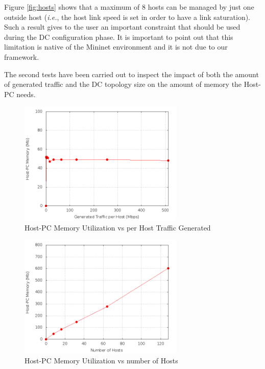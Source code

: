 \documentclass[12pt,english,oneside]{book}
\begin{document}
Figure \ref{fig:hosts} shows that a maximum of $8$ hosts can be managed by just one outside host (\textit{i.e.}, the host link speed is set in order to have a link saturation).
Such a result gives to the user an important constraint that should be used during the DC configuration phase.
It is important to point out that this limitation is native of the Mininet environment and it is not due to our framework.

The second tests have been carried out to inspect the impact of both the amount of generated traffic and the DC topology size on the amount of memory the Host-PC needs.

\newpage

\begin{figure}[h!tbp]
        \centering
        \includegraphics[width=0.7\textwidth]{figures/mem1_utilization.png}
        \caption{Host-PC Memory Utilization vs per Host Traffic Generated}
        \label{fig:mem1}
\end{figure}

\begin{figure}[h!tbp]
        \centering
        \includegraphics[width=0.7\textwidth]{figures/mem2_utilization.png}
        \caption{Host-PC Memory Utilization vs number of Hosts}
        \label{fig:mem2}
\end{figure}
\end{document}

